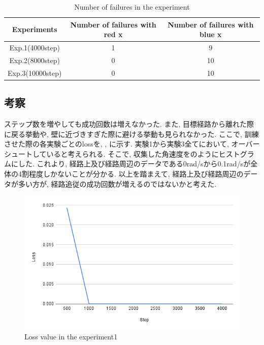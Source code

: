 \begin{table}[h]
  \centering
  \begin{tabular}{|c|c|c|} \hline
    Experiments & Number of failures with red x & Number of failures with blue x \\ \hline
    Exp.1(4000step) & 1 & 9 \\ \hline
    Exp.2(8000step) & 0 & 10 \\ \hline
    Exp.3(10000step) & 0 & 10 \\ \hline
  \end{tabular}
  \caption{Number of failures in the experiment}
  \label{tb:fail1}
\end{table}

\newpage
\subsection{考察}
ステップ数を増やしても成功回数は増えなかった.  また, 目標経路から離れた際に戻る挙動や, 壁に近づきすぎた際に避ける挙動も見られなかった. ここで, 訓練させた際の各実験ごとのlossを, , に示す. 実験1から実験3全てにおいて, オーバーシュートしていると考えられる. そこで, 収集した角速度をのようにヒストグラムにした. これより, 経路上及び経路周辺のデータである0rad/sから0.1rad/sが全体の4割程度しかないことが分かる. 以上を踏まえて, 経路上及び経路周辺のデータが多い方が, 経路追従の成功回数が増えるのではないかと考えた. 

\newpage
\begin{figure}[h]
  \centering
  \includegraphics[keepaspectratio, scale=0.31]{images/exp1-4000.png}
  \caption{Loss value in the experiment1}
  \label{Fig:exp1-4000}
  \end{figure}

